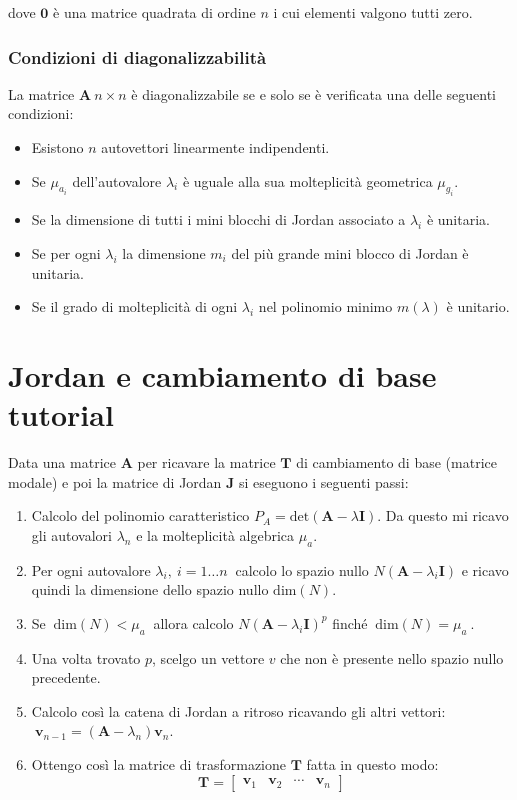 \documentclass[a4paper]{article}
\renewcommand{\vec}{\bm}
\theoremstyle{definition}
\begin{document}
	 			dove $ \vec{0} $ è una matrice quadrata di ordine $ n $ i cui elementi valgono tutti zero.
 			
 			\subsubsection{Condizioni di diagonalizzabilità}
	 			La matrice $ \vec{A}\ n\times n $ è diagonalizzabile se e solo se è verificata una delle seguenti condizioni:
	 			\begin{itemize}
	 				\item Esistono $ n $ autovettori linearmente indipendenti.
	 				\item Se $ \mu_{a_i} $ dell'autovalore $ \lambda_i $ è uguale alla sua molteplicità geometrica $ \mu_{g_i} $.
	 				\item Se la dimensione di tutti i mini blocchi di Jordan associato a $ \lambda_i $ è unitaria.
	 				\item Se per ogni $ \lambda_i $ la dimensione $ m_i $ del più grande mini blocco di Jordan è unitaria.
	 				\item Se il grado di molteplicità di ogni $ \lambda_i $ nel polinomio minimo $ m(\lambda) $ è unitario.
	 			\end{itemize}
		
		\section{Jordan e cambiamento di base tutorial}
			Data una matrice $ \vec{A} $ per ricavare la matrice $ \vec{T} $ di cambiamento di base (matrice modale) e poi la matrice di Jordan $ \vec{J} $ si eseguono i seguenti passi:
			\begin{enumerate}
				\item Calcolo del polinomio caratteristico $ P_A = \text{det}(\vec{A} - \lambda \vec{I}) $. Da questo mi ricavo gli autovalori $ \lambda_n $ e la molteplicità algebrica $ \mu_a $.
				\item Per ogni autovalore $ \lambda_i,\ i= 1\dots n\ $ calcolo lo spazio nullo $ N(\vec{A} - \lambda_i\vec{I}) $ e ricavo quindi la dimensione dello spazio nullo $ \text{dim}(N) $.
				\item Se $\ \text{dim}(N) < \mu_a\ $ allora calcolo $ N(\vec{A} - \lambda_i\vec{I})^p $ finché $\ \text{dim}(N) = \mu_a\ $.
				\item Una volta trovato $ p $, scelgo un vettore $ v $ che non è presente nello spazio nullo precedente.
				\item Calcolo così la catena di Jordan a ritroso ricavando gli altri vettori: 
				$\ \vec{v}_{n-1} = (\vec{A} - \lambda_n)\vec{v}_n $.
				\item Ottengo così la matrice di trasformazione $ \vec{T} $ fatta in questo modo:
				\[
					\vec{T} =
					\begin{bmatrix}
						\vec{v}_1 & \vec{v}_2 & \cdots & \vec{v}_n
					\end{bmatrix}
				\]
			\end{enumerate}
			
\end{document}
